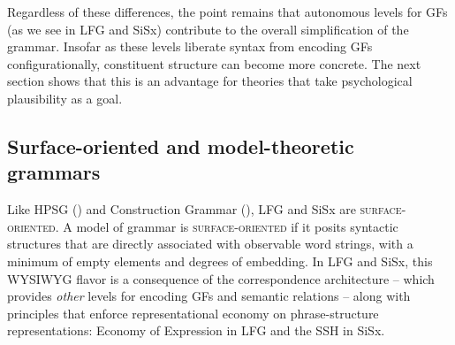 \documentclass[output=paper,hidelinks]{langscibook}
\begin{document}






Regardless of these differences, the point remains that autonomous levels for GFs (as we see in LFG and SiSx) contribute to the overall simplification of the grammar. Insofar as these levels liberate syntax from encoding GFs configurationally, constituent structure can become more concrete. The next section shows that this is an advantage for theories that take psychological plausibility as a goal. 

\subsection{Surface-oriented and model-theoretic grammars}

Like HPSG () and Construction Grammar (), LFG and SiSx are \textsc{surface-orien\-ted}.  A model of grammar is \textsc{surface-oriented} if it posits syntactic structures that are directly associated with observable word strings, with a minimum of empty elements and degrees of embedding. In LFG and SiSx, this WYSIWYG flavor is a consequence of the correspondence architecture -- which provides \textit{other} levels for encoding GFs and semantic relations  -- along with principles that enforce representational economy on phrase-structure representations: Economy of Expression in LFG \citep[91]{bresnan2001lexical} and the SSH in SiSx.
\end{document}
